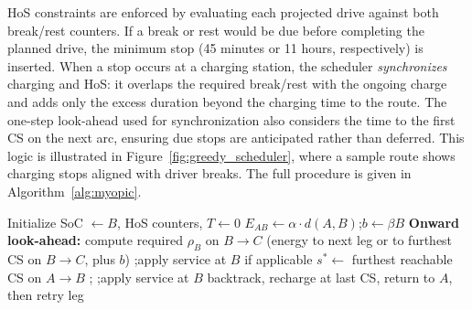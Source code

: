 \documentclass[3p,11pt,authoryear]{elsarticle}  %
\begin{document}
HoS constraints are enforced by evaluating each projected drive against both break/rest counters. If a break or rest would be due before completing the planned drive, the minimum stop (45 minutes or 11 hours, respectively) is inserted. When a stop occurs at a charging station, the scheduler \emph{synchronizes} charging and HoS: it overlaps the required break/rest with the ongoing charge and adds only the excess duration beyond the charging time to the route. The one-step look-ahead used for synchronization also considers the time to the first CS on the next arc, ensuring due stops are anticipated rather than deferred. This logic is illustrated in Figure~\ref{fig:greedy_scheduler}, where a sample route shows charging stops aligned with driver breaks. The full procedure is given in Algorithm~\ref{alg:myopic}.
\begin{algorithm}[H]
\caption{Sequential myopic scheduling heuristic}
\label{alg:myopic}
\small
\begin{algorithmic}[1]
\State Initialize SoC $\leftarrow B$, HoS counters, $T \leftarrow 0$
    \State $E_{AB} \leftarrow \alpha \cdot d(A,B)$;\quad $b \leftarrow \beta B$
    \State \textbf{Onward look-ahead:} compute required $\rho_B$ on $B\!\rightarrow\!C$
           (energy to next leg or to furthest CS on $B\!\rightarrow\!C$, plus $b$)
        \State {};\quad apply service at $B$ if applicable
        \State $s^\ast \leftarrow$ furthest reachable CS on $A\!\rightarrow\!B$
        \State {};\quad {}
        \State {};\quad apply service at $B$
        \State backtrack, recharge at last CS, return to $A$, then retry leg

\end{algorithmic}
\end{algorithm}
\end{document}
